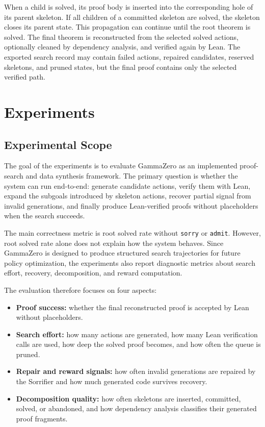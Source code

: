 \documentclass[en]{uet_awesome_thesis/uet-awesome-thesis}
\begin{document}
When a child is solved, its proof body is inserted into the corresponding hole of its parent skeleton. If
all children of a committed skeleton are solved, the skeleton closes its parent state. This propagation can
continue until the root theorem is solved. The final theorem is reconstructed from the selected solved
actions, optionally cleaned by dependency analysis, and verified again by Lean. The exported search
record may contain failed actions, repaired candidates, reserved skeletons, and pruned states, but the
final proof contains only the selected verified path.


\chapter{Experiments}
\label{sec:experiments}

\section{Experimental Scope}

The goal of the experiments is to evaluate GammaZero as an implemented proof-search and data synthesis framework. The primary question is whether the system can run end-to-end: generate candidate actions, verify them with Lean, expand the subgoals introduced by skeleton actions, recover partial signal from invalid generations, and finally produce Lean-verified proofs without placeholders when the search succeeds.

The main correctness metric is root solved rate without \texttt{sorry} or \texttt{admit}. However, root solved rate alone does not explain how the system behaves. Since GammaZero is designed to produce structured search trajectories for future policy optimization, the experiments also report diagnostic metrics about search effort, recovery, decomposition, and reward computation.

The evaluation therefore focuses on four aspects:
\begin{itemize}
    \item \textbf{Proof success:} whether the final reconstructed proof is accepted by Lean without placeholders.
    \item \textbf{Search effort:} how many actions are generated, how many Lean verification calls are used, how deep the solved proof becomes, and how often the queue is pruned.
    \item \textbf{Repair and reward signals:} how often invalid generations are repaired by the Sorrifier and how much generated code survives recovery.
    \item \textbf{Decomposition quality:} how often skeletons are inserted, committed, solved, or abandoned, and how dependency analysis classifies their generated proof fragments.
\end{itemize}
\end{document}
